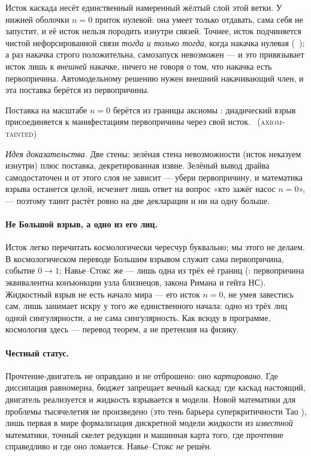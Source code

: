 Исток каскада несёт единственный намеренный жёлтый слой этой ветки. У нижней оболочки $n = 0$ приток
нулевой: она умеет только отдавать, сама себя не запустит, и её исток нельзя породить изнутри связей.
Точнее, исток подчиняется чистой нефорсированной связи \emph{тогда и только тогда}, когда накачка
нулевая (\green{}\ ); а раз накачка строго положительна,
самозапуск невозможен --- и это привязывает исток лишь к \emph{внешней} накачке, ничего не говоря о
том, что накачка есть первопричина. Автомодельному решению нужен внешний накачивающий член, и эта
поставка берётся из первопричины.

\begin{theorem}\label{thm:dyadicBlowup_is_firstCauseManifestation}
Поставка на масштабе $n = 0$ берётся из границы  аксиомы \axiom{}: диадический взрыв
присоединяется к манифестациям первопричины через свой исток. \yellow{}~(\textsc{axiom-tainted})
\end{theorem}

\emph{Идея доказательства.} Две стены: зелёная стена невозможности (исток неказуем изнутри) плюс
поставка, декретированная извне. Зелёный вывод драйва самодостаточен и от этого слоя не зависит ---
убери первопричину, и математика взрыва останется целой, исчезнет лишь ответ на вопрос «кто зажёг
насос $n=0$», --- поэтому таинт растёт ровно на две декларации и ни на одну больше.

\paragraph{Не Большой взрыв, а одно из его лиц.}
Исток легко перечитать космологически чересчур буквально; мы этого не делаем. В космологическом
переводе Большим взрывом служит сама первопричина, событие $0\to1$; Навье--Стокс же --- лишь одна из
трёх её границ (: первопричина эквивалентна конъюнкции
узла близнецов, закона Римана и гейта НС). Жидкостный взрыв не есть начало мира --- его исток $n=0$,
не умея завестись сам, лишь занимает искру у того же единственного начала: одно из трёх лиц одной
сингулярности, а не сама сингулярность. Как всюду в программе, космология здесь --- перевод теорем,
а не претензия на физику.

\paragraph{Честный статус.} Прочтение-двигатель не оправдано и не отброшено: оно
\emph{картировано}. Где диссипация равномерна, бюджет запрещает вечный каскад; где каскад настоящий,
двигатель реализуется и жидкость взрывается в модели. Новой математики для проблемы тысячелетия не
произведено (это тень барьера суперкритичности Тао \cite{clay-ns}), лишь первая в мире формализация
дискретной модели жидкости из \emph{известной} математики, точный скелет редукции и машинная карта
того, где прочтение справедливо и где оно ломается. Навье--Стокс \emph{не} решён.

